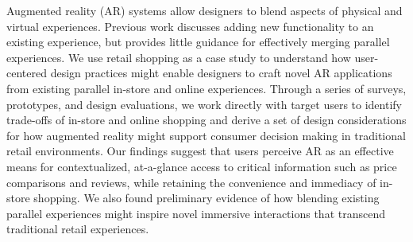 Augmented reality (AR) systems allow designers to blend aspects of physical and virtual experiences. Previous work discusses adding new functionality to an existing experience, but provides little guidance for effectively merging parallel experiences. We use retail shopping as a case study to understand how user-centered design practices might enable designers to craft novel AR applications from existing parallel in-store and online experiences. Through a series of surveys, prototypes, and design evaluations, we work directly with target users to identify trade-offs of in-store and online shopping and derive a set of design considerations for how augmented reality might support consumer decision making in traditional retail environments. Our findings suggest that users perceive AR as an effective means for contextualized, at-a-glance access to critical information such as price comparisons and reviews, while retaining the convenience and immediacy of in-store shopping. We also found preliminary evidence of how blending existing parallel experiences might inspire novel immersive interactions that transcend traditional retail experiences.

